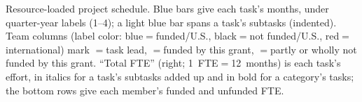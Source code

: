 
\begin{isANONschedule}
\caption{Resource-loaded project schedule. Blue bars give each task's months, under quarter-year labels (1--4); a light blue bar spans a task's subtasks (indented). Team columns (label color: blue$=$funded/U.S., black$=$not funded/U.S., red$=$international) mark \TeamLeadKey$=$task lead, \TeamFundedKey$=$funded by this grant, \TeamUnfundedKey$=$partly or wholly not funded by this grant. ``Total FTE'' (right; 1~FTE$=$12~months) is each task's effort, in italics for a task's subtasks added up and in bold for a category's tasks; the bottom rows give each member's funded and unfunded FTE.}
\label{tab:isANONschedule}
\end{isANONschedule}

